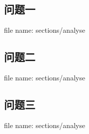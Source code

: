 \documentclass[../main.tex]{subfiles}
\begin{document}
\subsection{问题一}
  file name: sections/analyse
\subsection{问题二}
  file name: sections/analyse
\subsection{问题三}
  file name: sections/analyse
\end{document}
